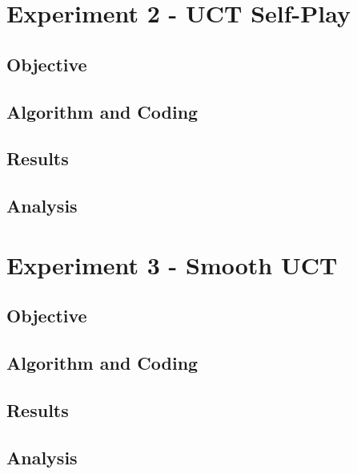 \section{Experiment 2 - UCT Self-Play} \label{sec:experiment2}

\subsection{Objective}\label{subsec:objective2}
\subsection{Algorithm and Coding}\label{subsec:algAndCoding2}
\subsection{Results}\label{subsec:results2}
\subsection{Analysis}\label{subsec:analysis2}

\section{Experiment 3 - Smooth UCT}\label{sec:experiment3}

\subsection{Objective}\label{subsec:objective3}
\subsection{Algorithm and Coding}\label{subsec:algAndCoding3}
\subsection{Results}\label{subsec:results3}
\subsection{Analysis}\label{subsec:analysis3}

